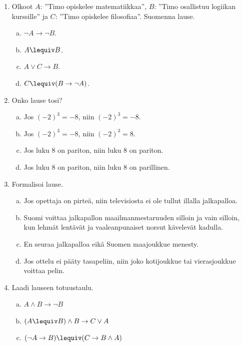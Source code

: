 \begin{enumerate}

\item
Olkoot $A$: ''Timo opiskelee matematiikkaa'', $B$: ''Timo osallistuu logiikan kurssille'' ja $C$: ''Timo opiskelee filosofiaa''. Suomenna lause.
\begin{enumerate}[a)]
\item $\lnot A \to \lnot B$.
\item $A\lequiv B$.
\item $A\lor C \to B$.
\item $C\lequiv (B\to \lnot A)$.
\end{enumerate}

\item Onko lause tosi?
\begin{enumerate}[a)]
\item Jos $(-2)^3= -8$, niin $(-2)^3= -8$.
\item Jos $(-2)^3= -8$, niin $(-2)^3=  8$.
\item Jos luku $8$ on pariton, niin luku $8$ on pariton.
\item Jos luku $8$ on pariton, niin luku $8$ on parillinen.
\end{enumerate}

\item
Formalisoi lause.
\begin{enumerate}[a)]
\item Jos opettaja on pirteä, niin televisiosta ei ole tullut illalla jalkapalloa.
\item Suomi voittaa jalkapallon maailmanmestaruuden silloin ja vain silloin, kun lehmät lentävät ja vaaleanpunaiset norsut kävelevät kadulla.
\item En seuraa jalkapalloa eikä Suomen maajoukkue menesty. 
\item Jos ottelu ei pääty tasapeliin, niin joko kotijoukkue tai vierasjoukkue voittaa pelin.
\end{enumerate}

\item Laadi lauseen totuustaulu.
\begin{enumerate}[a)]
\item $A\land B\to \lnot B$
\item $(A\lequiv B)\land B\to C\lor A$
\item $(\lnot A\to B)\lequiv (C\to B\land A)$
\end{enumerate}



\end{enumerate}
